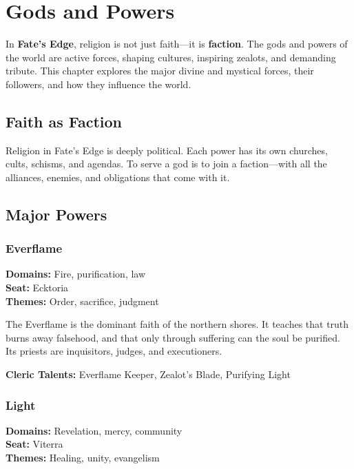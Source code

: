 
\chapter{Gods and Powers}
\label{ch:gods-powers}

In \textbf{Fate's Edge}, religion is not just faith—it is \textbf{faction}. The gods and powers of the world are active forces, shaping cultures, inspiring zealots, and demanding tribute. This chapter explores the major divine and mystical forces, their followers, and how they influence the world.

\section{Faith as Faction}

Religion in Fate's Edge is deeply political. Each power has its own churches, cults, schisms, and agendas. To serve a god is to join a faction—with all the alliances, enemies, and obligations that come with it.

\section{Major Powers}

\subsection*{Everflame}

\textbf{Domains:} Fire, purification, law \\
\textbf{Seat:} Ecktoria \\
\textbf{Themes:} Order, sacrifice, judgment

The Everflame is the dominant faith of the northern shores. It teaches that truth burns away falsehood, and that only through suffering can the soul be purified. Its priests are inquisitors, judges, and executioners.

\textbf{Cleric Talents:} Everflame Keeper, Zealot's Blade, Purifying Light

\subsection*{Light}

\textbf{Domains:} Revelation, mercy, community \\
\textbf{Seat:} Viterra \\
\textbf{Themes:} Healing, unity, evangelism

